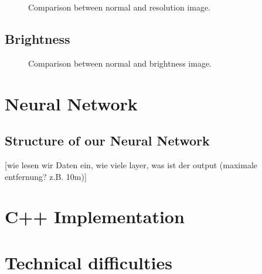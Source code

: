 \begin{figure}[h!]
	\centering
	\caption{Comparison between normal and resolution image.}
	\label{pic:implementation_opencv_resolution}
\end{figure}

\subsection{Brightness}

\begin{figure}[h!]
	\centering
	\caption{Comparison between normal and brightness image.}
	\label{pic:implementation_opencv_brightness}
\end{figure}

\section{Neural Network}
\subsection{Structure of our Neural Network}

[wie lesen wir Daten ein, wie viele layer, was ist der output (maximale entfernung? z.B. 10m)]

\section{C++ Implementation}

\section{Technical difficulties}

\filbreak